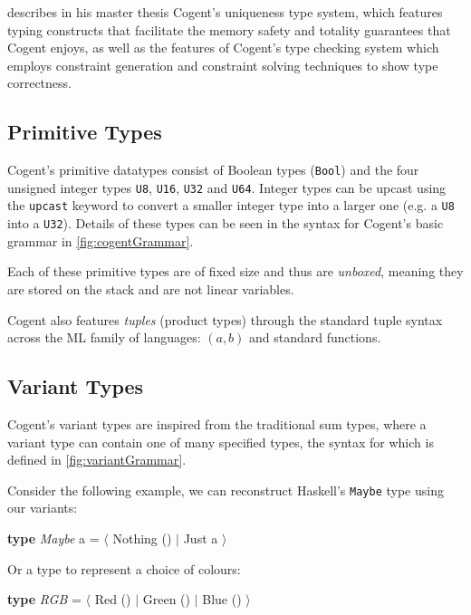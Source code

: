 \citet{LiamThesis} describes in his master thesis Cogent's uniqueness type
system, which features typing constructs that facilitate the memory safety
and totality guarantees that Cogent enjoys, as well as the features of
Cogent's type checking system which employs constraint generation
and constraint solving techniques to show type correctness.

\subsection{Primitive Types}

Cogent's primitive datatypes consist of Boolean types (\texttt{Bool}) and the four unsigned integer types \texttt{U8}, 
\texttt{U16}, \texttt{U32} and \texttt{U64}. Integer types can be upcast using the \texttt{\textsf{upcast}}
keyword to convert a smaller integer type into a larger one (e.g. a \texttt{U8} into a \texttt{U32}).
Details of these types can be seen in the syntax for Cogent's basic grammar in \ref{fig:cogentGrammar}.

Each of these primitive types are of fixed size and thus are \emph{unboxed}, meaning they are stored on the
stack and are not linear variables.

Cogent also features \emph{tuples} (product types) through the standard tuple syntax across the ML
family of languages: $(a,b)$ and standard functions.

\subsection{Variant Types}

Cogent's variant types are inspired from the traditional sum types, where a variant type can contain
one of many specified types, the syntax for which is defined in \autoref{fig:variantGrammar}.

Consider the following example, we can reconstruct Haskell's \texttt{Maybe} type using our variants:

\begin{center}
    \textbf{type} \textit{Maybe} a = $\langle$ Nothing () $\vert$ Just a $\rangle$
\end{center}

Or a type to represent a choice of colours:

\begin{center}
    \textbf{type} \textit{RGB} = $\langle$ Red () $\vert$ Green () $\vert$ Blue () $\rangle$
\end{center}

